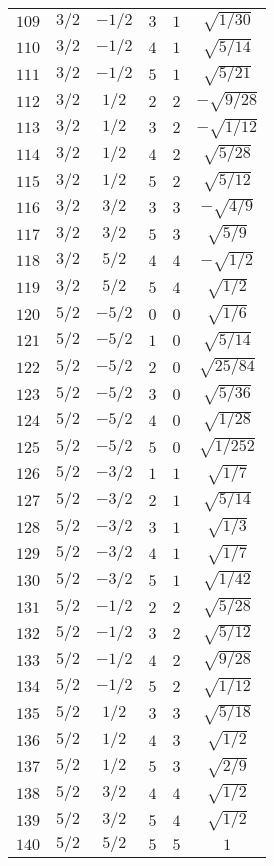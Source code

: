 \begin{table}
\begin{center}
\begin{tabular}{|c|c|c|c|c|c|}
$109$ & $3/2$ & $-1/2$ & $3$ & $1$ & $\sqrt{1/30}$ \\ 
$110$ & $3/2$ & $-1/2$ & $4$ & $1$ & $\sqrt{5/14}$ \\ 
$111$ & $3/2$ & $-1/2$ & $5$ & $1$ & $\sqrt{5/21}$ \\ 
$112$ & $3/2$ & $1/2$ & $2$ & $2$ & $-\sqrt{9/28}$ \\ 
$113$ & $3/2$ & $1/2$ & $3$ & $2$ & $-\sqrt{1/12}$ \\ 
$114$ & $3/2$ & $1/2$ & $4$ & $2$ & $\sqrt{5/28}$ \\ 
$115$ & $3/2$ & $1/2$ & $5$ & $2$ & $\sqrt{5/12}$ \\ 
$116$ & $3/2$ & $3/2$ & $3$ & $3$ & $-\sqrt{4/9}$ \\ 
$117$ & $3/2$ & $3/2$ & $5$ & $3$ & $\sqrt{5/9}$ \\ 
$118$ & $3/2$ & $5/2$ & $4$ & $4$ & $-\sqrt{1/2}$ \\ 
$119$ & $3/2$ & $5/2$ & $5$ & $4$ & $\sqrt{1/2}$ \\ 
$120$ & $5/2$ & $-5/2$ & $0$ & $0$ & $\sqrt{1/6}$ \\ 
$121$ & $5/2$ & $-5/2$ & $1$ & $0$ & $\sqrt{5/14}$ \\ 
$122$ & $5/2$ & $-5/2$ & $2$ & $0$ & $\sqrt{25/84}$ \\ 
$123$ & $5/2$ & $-5/2$ & $3$ & $0$ & $\sqrt{5/36}$ \\ 
$124$ & $5/2$ & $-5/2$ & $4$ & $0$ & $\sqrt{1/28}$ \\ 
$125$ & $5/2$ & $-5/2$ & $5$ & $0$ & $\sqrt{1/252}$ \\ 
$126$ & $5/2$ & $-3/2$ & $1$ & $1$ & $\sqrt{1/7}$ \\ 
$127$ & $5/2$ & $-3/2$ & $2$ & $1$ & $\sqrt{5/14}$ \\ 
$128$ & $5/2$ & $-3/2$ & $3$ & $1$ & $\sqrt{1/3}$ \\ 
$129$ & $5/2$ & $-3/2$ & $4$ & $1$ & $\sqrt{1/7}$ \\ 
$130$ & $5/2$ & $-3/2$ & $5$ & $1$ & $\sqrt{1/42}$ \\ 
$131$ & $5/2$ & $-1/2$ & $2$ & $2$ & $\sqrt{5/28}$ \\ 
$132$ & $5/2$ & $-1/2$ & $3$ & $2$ & $\sqrt{5/12}$ \\ 
$133$ & $5/2$ & $-1/2$ & $4$ & $2$ & $\sqrt{9/28}$ \\ 
$134$ & $5/2$ & $-1/2$ & $5$ & $2$ & $\sqrt{1/12}$ \\ 
$135$ & $5/2$ & $1/2$ & $3$ & $3$ & $\sqrt{5/18}$ \\ 
$136$ & $5/2$ & $1/2$ & $4$ & $3$ & $\sqrt{1/2}$ \\ 
$137$ & $5/2$ & $1/2$ & $5$ & $3$ & $\sqrt{2/9}$ \\ 
$138$ & $5/2$ & $3/2$ & $4$ & $4$ & $\sqrt{1/2}$ \\ 
$139$ & $5/2$ & $3/2$ & $5$ & $4$ & $\sqrt{1/2}$ \\ 
$140$ & $5/2$ & $5/2$ & $5$ & $5$ & $1$ \\ 
\hline 
\end{tabular}
\end{center}
\end{table}

